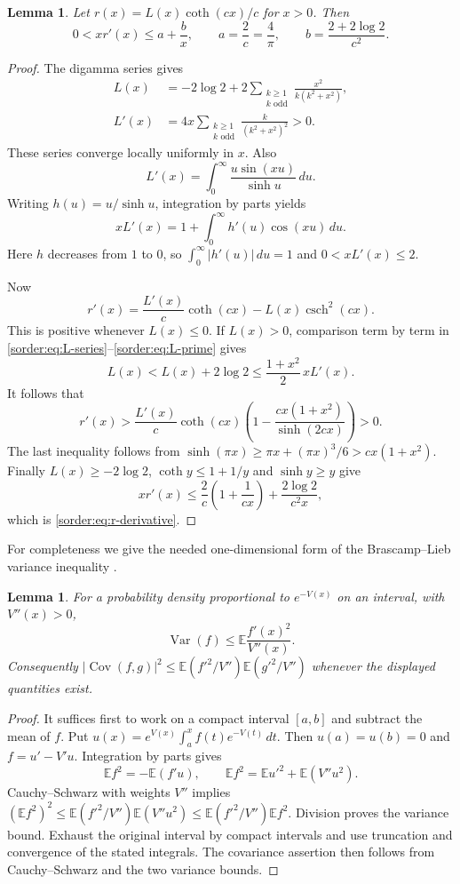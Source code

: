 \documentclass[11pt,a4paper]{article}
\newtheorem{lemma}[theorem]{Lemma}
\theoremstyle{definition}
\theoremstyle{remark}
\newcommand{\csch}{\operatorname{csch}}
\newcommand{\E}{\mathbb E}
\newcommand{\Var}{\operatorname{Var}}
\newcommand{\Cov}{\operatorname{Cov}}
\numberwithin{equation}{section}
\begin{document}
\begin{lemma}\label{sorder:lem:r}
Let $r(x)=L(x)\coth(cx)/c$ for $x>0$. Then
\begin{equation}\label{sorder:eq:r-derivative}
 0<xr'(x)\le a+\frac b x,\qquad
 a=\frac2c=\frac4\pi,\qquad
 b=\frac{2+2\log2}{c^2}.
\end{equation}
\end{lemma}
\begin{proof}
The digamma series gives
\begin{align}
 L(x)&=-2\log2+2\sum_{\substack{k\ge1\\k\text{ odd}}}
          \frac{x^2}{k(k^2+x^2)},\label{sorder:eq:L-series}\\
 L'(x)&=4x\sum_{\substack{k\ge1\\k\text{ odd}}}
          \frac{k}{(k^2+x^2)^2}>0.\label{sorder:eq:L-prime}
\end{align}
These series converge locally uniformly in $x$. Also
\[
 L'(x)=\int_0^\infty\frac{u\sin(xu)}{\sinh u}\,du.
\]
Writing $h(u)=u/\sinh u$, integration by parts yields
\[
 xL'(x)=1+\int_0^\infty h'(u)\cos(xu)\,du.
\]
Here $h$ decreases from $1$ to $0$, so
$\int_0^\infty|h'(u)|\,du=1$ and $0<xL'(x)\le2$.

Now
\[
 r'(x)=\frac{L'(x)}c\coth(cx)-L(x)\csch^2(cx).
\]
This is positive whenever $L(x)\le0$. If $L(x)>0$, comparison term
by term in \eqref{sorder:eq:L-series}--\eqref{sorder:eq:L-prime}
gives
\[
 L(x)<L(x)+2\log2\le\frac{1+x^2}{2}\,xL'(x).
\]
It follows that
\[
 r'(x)>\frac{L'(x)}c\coth(cx)
 \left(1-\frac{cx(1+x^2)}{\sinh(2cx)}\right)>0.
\]
The last inequality follows from
$\sinh(\pi x)\ge\pi x+(\pi x)^3/6>cx(1+x^2)$.
Finally $L(x)\ge-2\log2$, $\coth y\le1+1/y$ and $\sinh y\ge y$
give
\[
 xr'(x)\le\frac2c\left(1+\frac1{cx}\right)
       +\frac{2\log2}{c^2x},
\]
which is \eqref{sorder:eq:r-derivative}.
\end{proof}

For completeness we give the needed one-dimensional form of the
Brascamp--Lieb variance inequality \cite{BL}.
\begin{lemma}\label{sorder:lem:BL}
For a probability density proportional to $e^{-V(x)}$ on an interval,
with $V''(x)>0$,
\[
 \Var(f)\le\E\frac{f'(x)^2}{V''(x)}.
\]
Consequently
$|\Cov(f,g)|^2\le
\E(f'^2/V'')\E(g'^2/V'')$ whenever the displayed quantities exist.
\end{lemma}
\begin{proof}
It suffices first to work on a compact interval $[a,b]$ and subtract
the mean of $f$. Put
$u(x)=e^{V(x)}\int_a^x f(t)e^{-V(t)}\,dt$.
Then $u(a)=u(b)=0$ and $f=u'-V'u$. Integration by parts gives
\[
 \E f^2=-\E(f'u),\qquad
 \E f^2=\E u'^2+\E(V''u^2).
\]
Cauchy--Schwarz with weights $V''$ implies
$(\E f^2)^2\le\E(f'^2/V'')\E(V''u^2)
\le\E(f'^2/V'')\E f^2$. Division proves the variance bound.
Exhaust the original interval by compact intervals and use truncation
and convergence of the stated integrals. The covariance assertion
then follows from Cauchy--Schwarz and the two variance bounds.
\end{proof}
\end{document}
